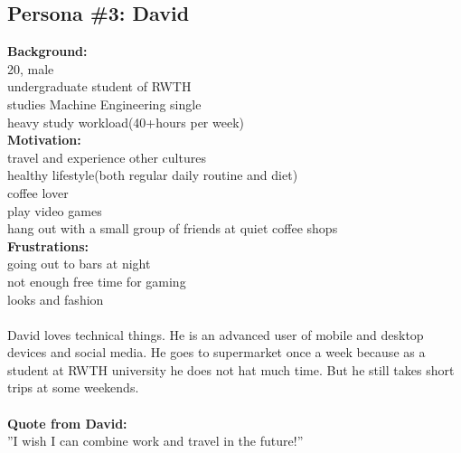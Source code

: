 \documentclass[a4paper,10pt,oneside]{scrreprt}
\begin{document}
				\subsection{Persona \#3: David}
			\begin{mdframed}
				\begin{minipage}{\textwidth}
				\begin{figure}
						\centering
						\vspace{-4cm}
					\end{figure}


					\textbf{Background:}\\
					20, male\\
	                undergraduate student of RWTH\\
	                studies Machine Engineering
	                single\\
	                heavy study workload(40+hours per week)\\



					\textbf{Motivation:}\\
					travel and experience other cultures\\
	                healthy lifestyle(both regular daily routine and diet)\\
	                coffee lover\\
	                play video games\\
	                hang out with a small group of friends at quiet coffee shops\\


					\textbf{Frustrations:}\\
					going out to bars at night\\
	                not enough free time for gaming\\
	                looks and fashion\\
	                \\
	                David loves technical things. He is an advanced user of mobile and desktop devices and social media. He goes to supermarket once a week because as a student at RWTH university he does not hat much time. But he still takes short trips at some weekends.\\
	                \\
	                \textbf{Quote from David:}\\
				''I wish I can combine work and travel in the future!''\\
				\end{minipage}
				\end{mdframed}
\end{document}
